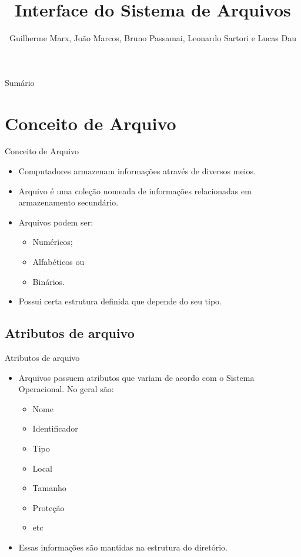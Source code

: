 \documentclass[10pt,brazil]{beamer}
\title[Interface do Sistema de Arquivos]{Interface do Sistema de Arquivos}
\author[ICEA - UFOP]{Guilherme Marx, João Marcos, Bruno Passamai, Leonardo Sartori e Lucas Dau}
\begin{document}
 	   \maketitle
		\begin{frame}{Sumário}
			\tiny \tableofcontents
		\end{frame}


\section{Conceito de Arquivo}%

\begin{frame}{Conceito de Arquivo}	
	
	\begin{itemize}

	\item Computadores armazenam informações através de diversos meios.
	\item Arquivo é uma coleção nomeada de informações relacionadas em armazenamento secundário.
	\item Arquivos podem ser:
	\begin{itemize}
		\item Numéricos;
		\item Alfabéticos ou
		\item Binários.
	\end{itemize}
	\item Possui certa estrutura definida que depende do seu tipo.
	\end{itemize}
\end{frame}

\subsection {Atributos de arquivo}
    
\begin{frame}{Atributos de arquivo}	
	\begin{itemize}

	\item Arquivos possuem atributos que variam de acordo com o Sistema Operacional. No geral são:
	\begin{itemize}
		\item Nome
		\item Identificador
		\item Tipo
		\item Local
		\item Tamanho
		\item Proteção
		\item etc
	\end{itemize}
	\item Essas informações são mantidas na estrutura do diretório.
	\end{itemize}
\end{frame}
\end{document}
